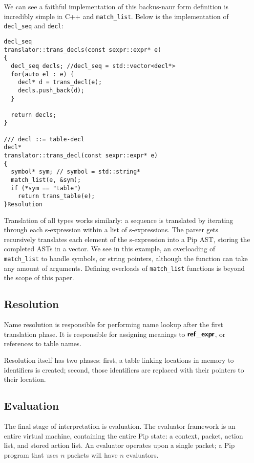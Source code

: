 We can see a faithful implementation of this backus-naur form definition is incredibly simple in C++ and \texttt{match\_list}. Below is the implementation of \texttt{decl\_seq} and \texttt{decl}:
\begin{mdframed}
\begin{verbatim}
decl_seq
translator::trans_decls(const sexpr::expr* e)
{
  decl_seq decls; //decl_seq = std::vector<decl*>
  for(auto el : e) {
    decl* d = trans_decl(e);
    decls.push_back(d);
  }
   
  return decls;
}
  
/// decl ::= table-decl
decl*
translator::trans_decl(const sexpr::expr* e)
{
  symbol* sym; // symbol = std::string*
  match_list(e, &sym);
  if (*sym == "table")
    return trans_table(e);
}Resolution
\end{verbatim}
\end{mdframed}
Translation of all types works similarly: a sequence is translated by iterating through each s-expression within a list of s-expressions. The parser gets recursively translates each element of the s-expression into a Pip AST, storing the completed ASTs in a vector. We see in this example, an overloading of \texttt{match\_list} to handle symbols, or string pointers, although the function can take any amount of arguments. Defining overloads of \texttt{match\_list} functions is beyond the scope of this paper.
           
\subsection{Resolution}
Name resolution is responsible for performing name lookup after the first translation phase. It is responsible for assigning meanings to $\bm{\mathsf{{ref\_expr}}}$, or references to table names.

Resolution itself has two phases: first, a table linking locations in memory to identifiers is created; second, those identifiers are replaced with their pointers to their location.
\subsection{Evaluation}
The final stage of interpretation is evaluation. The evaluator framework is an entire virtual machine, containing the entire Pip state: a context, packet, action list, and stored action list. An evaluator operates upon a single packet; a Pip program that uses $n$ packets will have $n$ evaluators.

